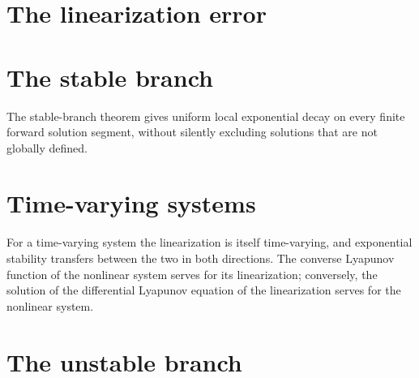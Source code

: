 \section{The linearization error}






\section{The stable branch}

The stable-branch theorem gives uniform local exponential decay on every finite
forward solution segment, without silently excluding solutions that are not
globally defined.


\section{Time-varying systems}

For a time-varying system the linearization is itself time-varying, and exponential stability
transfers between the two in both directions.  The converse Lyapunov function of the nonlinear
system serves for its linearization; conversely, the solution of the differential Lyapunov
equation of the linearization serves for the nonlinear system.





\section{The unstable branch}

